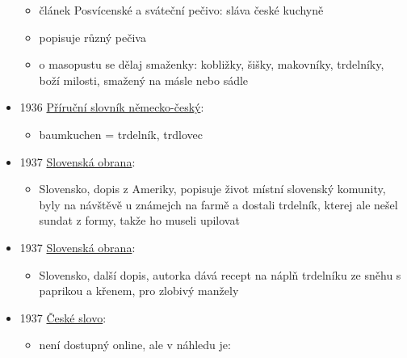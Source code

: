\begin{itemize}
  \begin{itemize}
  \tightlist
  \item
    článek Posvícenské a sváteční pečivo: sláva české kuchyně
  \item
    popisuje různý pečiva
  \item
    o masopustu se dělaj smaženky: kobližky, šišky, makovníky,
    trdelníky, boží milosti, smažený na másle nebo sádle
  \end{itemize}
\item
  1936
  \href{https://ceskadigitalniknihovna.cz/view/uuid:d4dd6060-bfc4-11e3-aec3-005056827e52?page=uuid\%3A23cc3e33-7f1f-49cd-8c09-67351d084c07&fulltext=trdeln*&source=nkp}{Příruční
  slovník německo-český}:

  \begin{itemize}
  \tightlist
  \item
    baumkuchen = trdelník, trdlovec
  \end{itemize}
\item
  1937
  \href{http://digitalna.kniznica.info/zoom/90599/view?search=trdeln\%C3\%ADk\%20OR\%20trdeln\%C3\%ADka\%20OR\%20trdeln\%C3\%ADku&page=6&p=separate&tool=search&view=1502,2130,4778,2339}{Slovenská
  obrana}:

  \begin{itemize}
  \tightlist
  \item
    Slovensko, dopis z Ameriky, popisuje život místní slovenský
    komunity, byly na návštěvě u známejch na farmě a dostali trdelník,
    kterej ale nešel sundat z formy, takže ho museli upilovat
  \end{itemize}
\item
  1937
  \href{http://digitalna.kniznica.info/zoom/90688/view?search=trdeln\%C3\%ADk\%20OR\%20trdeln\%C3\%ADka\%20OR\%20trdeln\%C3\%ADku&page=6&p=separate&tool=search&view=2631,1599,4628,2266}{Slovenská
  obrana}:

  \begin{itemize}
  \tightlist
  \item
    Slovensko, další dopis, autorka dává recept na náplň trdelníku ze
    sněhu s paprikou a křenem, pro zlobivý manžely
  \end{itemize}
\item
  1937
  \href{https://ceskadigitalniknihovna.cz/uuid/uuid:b42af96b-ef00-4cc8-ac42-7413f52b7595}{České
  slovo}:

  \begin{itemize}
  \tightlist
  \item
    není dostupný online, ale v náhledu je:


\end{itemize}
\end{itemize}
